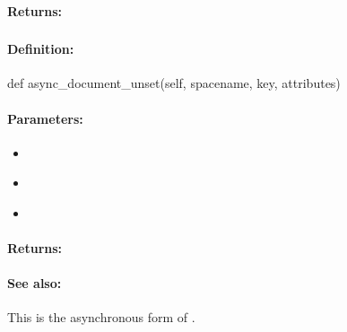 \paragraph{Returns:}


\pagebreak
\subsubsection{}
\label{api:python:async_document_unset}


\paragraph{Definition:}
\begin{pythoncode}
def async_document_unset(self, spacename, key, attributes)
\end{pythoncode}

\paragraph{Parameters:}
\begin{itemize}[noitemsep]
\item {}\\

\item {}\\

\item {}\\

\end{itemize}

\paragraph{Returns:}


\paragraph{See also:}  This is the asynchronous form of .

\pagebreak
\subsubsection{}
\label{api:python:microtransaction_document_unset}



